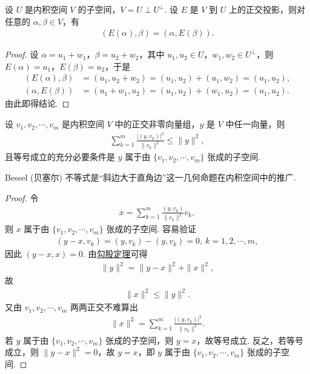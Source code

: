 \documentclass[../../main.tex]{subfiles}%
\begin{document}
\begin{proposition}\label{proposition:正交投影的性质}
设 $U$ 是内积空间 $V$ 的子空间，$V = U \perp U^\perp$. 设 $E$ 是 $V$ 到 $U$ 上的正交投影，则对任意的 $\alpha, \beta \in V$，有
\begin{align*}
(E(\alpha), \beta) = (\alpha, E(\beta)).
\end{align*}
\end{proposition}
\begin{proof}

设 $\alpha = u_1 + w_1$，$\beta = u_2 + w_2$，其中 $u_1, u_2 \in U$，$w_1, w_2 \in U^\perp$，则 $E(\alpha) = u_1$，$E(\beta) = u_2$，于是
\begin{align*}
(E(\alpha), \beta) &= (u_1, u_2 + w_2) = (u_1, u_2) + (u_1, w_2) = (u_1, u_2), \\
(\alpha, E(\beta)) &= (u_1 + w_1, u_2) = (u_1, u_2) + (w_1, u_2) = (u_1, u_2).
\end{align*}
由此即得结论.

\end{proof}

\begin{proposition}\label{proposition:Bessel不等式}
设 $v_1, v_2, \cdots, v_m$ 是内积空间 $V$ 中的正交非零向量组，$y$ 是 $V$ 中任一向量，则
\begin{align*}
\sum_{k = 1}^{m}\frac{|(y, v_k)|^2}{\|v_k\|^2} \leqslant  \|y\|^2,
\end{align*}
且等号成立的充分必要条件是 $y$ 属于由 $\{v_1, v_2, \cdots, v_m\}$ 张成的子空间.
\end{proposition}
\begin{remark}
Bessel (贝塞尔) 不等式是“斜边大于直角边”这一几何命题在内积空间中的推广.
\end{remark}
\begin{proof}

令
\begin{align*}
x = \sum_{k = 1}^{m}\frac{(y, v_k)}{\|v_k\|^2}v_k,
\end{align*}
则 $x$ 属于由 $\{v_1, v_2, \cdots, v_m\}$ 张成的子空间. 容易验证
\begin{align*}
(y - x, v_k) =(y,v_k)-(y,v_k)= 0, \ k = 1, 2, \cdots, m,
\end{align*}
因此 $(y - x, x) = 0$. 由\hyperref[corollary:范数性质的相关推广-勾股定理]{勾股定理}可得
\begin{align*}
\|y\|^2 = \|y - x\|^2 + \|x\|^2,
\end{align*}
故
\begin{align*}
\|x\|^2 \leqslant  \|y\|^2.
\end{align*}
又由 $v_1, v_2, \cdots, v_m$ 两两正交不难算出
\begin{align*}
\|x\|^2 = \sum_{k = 1}^{m}\frac{|(y, v_k)|^2}{\|v_k\|^2}.
\end{align*}
若 $y$ 属于由 $\{v_1, v_2, \cdots, v_m\}$ 张成的子空间，则 $y = x$，故等号成立. 反之，若等号成立，则 $\|y - x\|^2 = 0$，故 $y = x$，即 $y$ 属于由 $\{v_1, v_2, \cdots, v_m\}$ 张成的子空间. 

\end{proof}
\end{document}
